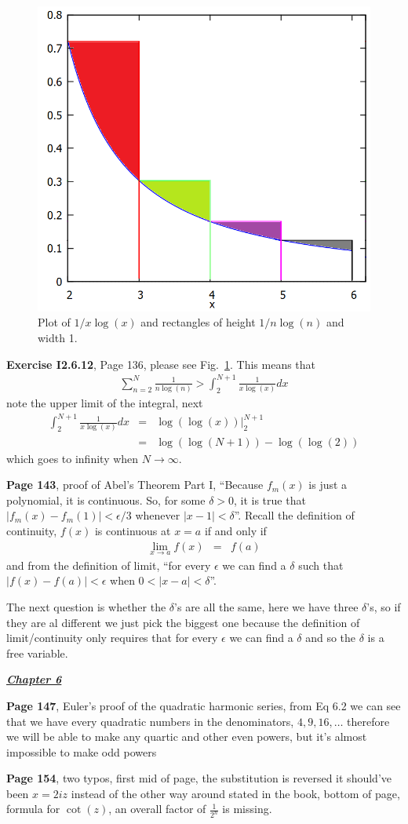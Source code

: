 \documentclass[aps,preprint,preprintnumbers,nofootinbib,showpacs,prd]{revtex4-1}
\newcommand{\nbea}{\begin{eqnarray*}}
\newcommand{\neea}{\end{eqnarray*}}
\begin{document}
%
\begin{figure}
\centering
  \includegraphics[width=.7\linewidth]{ExerciseI2_6_12.png}
  \caption{Plot of $1/x\log(x)$ and rectangles of height $1/n\log(n)$ and width 1.}
\label{fig:I2.6.12}
\end{figure}
%
{\bf Exercise I2.6.12}, Page 136, please see Fig.~\ref{fig:I2.6.12}. This means that
%
\nbea
\sum_{n=2}^N \frac{1}{n\log(n)} > \int_2^{N+1} \frac{1}{x\log(x)} dx
\neea
%
note the upper limit of the integral, next
%
\nbea
\int_2^{N+1} \frac{1}{x\log(x)} dx & = & \left.\log(\log(x))\right|_2^{N+1} \\
& = & \log(\log(N+1)) - \log(\log(2))
\neea
%
which goes to infinity when $N\to\infty$.

{\bf Page 143}, proof of Abel's Theorem Part I, ``Because $f_m(x)$ is just a polynomial, it is continuous. So, for some $\delta>0$, it is true that $|f_m(x) - f_m(1)|<\epsilon/3$ whenever $|x-1|<\delta$''. Recall the definition of continuity, $f(x)$ is continuous at $x=a$ if and only if
%
\nbea
\lim_{x\to a} f(x) & = & f(a)
\neea
%
and from the definition of limit, ``for every $\epsilon$ we can find a $\delta$ such that $|f(x) - f(a)|<\epsilon$ when $0 <|x-a|<\delta$''.

The next question is whether the $\delta$'s are all the same, here we have three $\delta$'s, so if they are al different we just pick the biggest one because the definition of limit/continuity only requires that for every $\epsilon$ we can find a $\delta$ and so the $\delta$ is a free variable.

\bigskip
\underline{\textit{\textbf{Chapter 6}}}
\bigskip

{\bf Page 147}, Euler's proof of the quadratic harmonic series, from Eq 6.2 we can see that we have every quadratic numbers in the denominators, $4,9,16,\ldots$ therefore we will be able to make any quartic and other even powers, but it's almost impossible to make odd powers

{\bf Page 154}, two typos, first mid of page, the substitution is reversed it should've been $x = 2iz$ instead of the other way around stated in the book, bottom of page, formula for $\cot(z)$, an overall factor of $\frac{1}{2^n}$ is missing.
\end{document}
